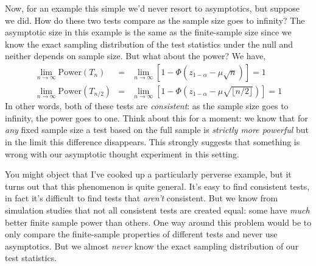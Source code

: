Now, for an example this simple we'd never resort to asymptotics, but suppose we did. 
How do these two tests compare as the sample size goes to infinity? 
The asymptotic size in this example is the same as the finite-sample size since we know the exact sampling distribution of the test statistics under the null and neither depends on sample size. 
But what about the power? 
We have,
\begin{eqnarray*}
\lim_{n\rightarrow \infty} \mbox{Power}(T_{n}) &=& \lim_{n\rightarrow \infty}\left[1 - \Phi\left(z_{1-\alpha} - \mu\sqrt{n}\right) \right] = 1\\
\lim_{n\rightarrow \infty} \mbox{Power}(T_{n/2}) &=& \lim_{n\rightarrow \infty}\left[1 - \Phi\left(z_{1-\alpha} - \mu\sqrt{\lfloor n/2 \rfloor }\right) \right] = 1
\end{eqnarray*}
In other words, both of these tests are \emph{consistent}: as the sample size goes to infinity, the power goes to one. 
Think about this for a moment: we know that for \emph{any} fixed sample size a test based on the full sample is \emph{strictly more powerful} but in the limit this difference disappears. 
This strongly suggests that something is wrong with our asymptotic thought experiment in this setting.

You might object that I've cooked up a particularly perverse example, but it turns out that this phenomenon is quite general. 
It's easy to find consistent tests, in fact it's difficult to find tests that \emph{aren't} consistent. 
But we know from simulation studies that not all consistent tests are created equal: some have \emph{much} better finite sample power than others. 
One way around this problem would be to only compare the finite-sample properties of different tests and never use asymptotics. 
But we almost \emph{never} know the exact sampling distribution of our test statistics.

